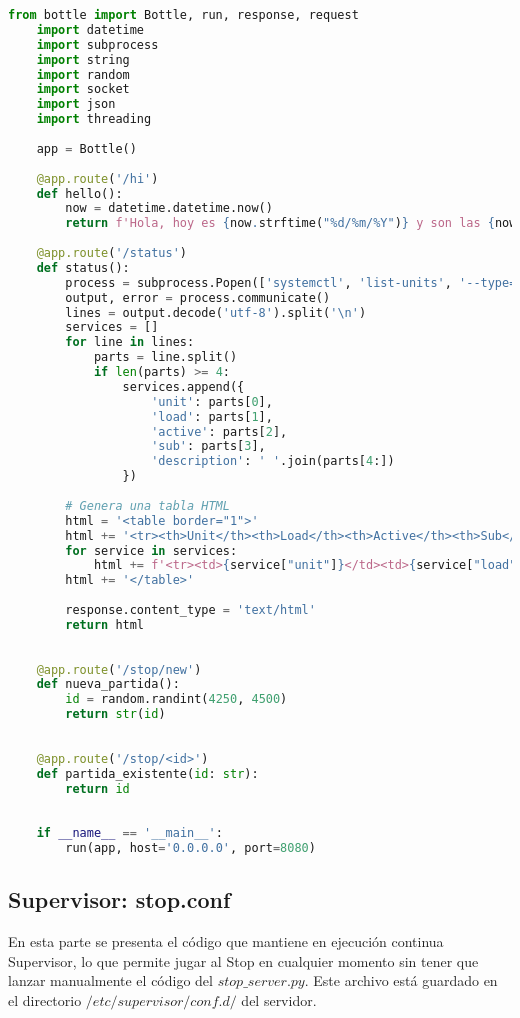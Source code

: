\documentclass{article}
\begin{document}
\begin{lstlisting}[language=Python, caption={Código Python}, label={lst:python_code}]
    from bottle import Bottle, run, response, request
    import datetime
    import subprocess
    import string
    import random
    import socket
    import json
    import threading
    
    app = Bottle()
    
    @app.route('/hi')
    def hello():
        now = datetime.datetime.now()
        return f'Hola, hoy es {now.strftime("%d/%m/%Y")} y son las {now.strftime("%H:%M:%S")}'
    
    @app.route('/status')
    def status():
        process = subprocess.Popen(['systemctl', 'list-units', '--type=service', '--state=running'], stdout=subprocess.PIPE)
        output, error = process.communicate()
        lines = output.decode('utf-8').split('\n')
        services = []
        for line in lines:
            parts = line.split()
            if len(parts) >= 4:
                services.append({
                    'unit': parts[0],
                    'load': parts[1],
                    'active': parts[2],
                    'sub': parts[3],
                    'description': ' '.join(parts[4:])
                })
    
        # Genera una tabla HTML
        html = '<table border="1">'
        html += '<tr><th>Unit</th><th>Load</th><th>Active</th><th>Sub</th><th>Description</th></tr>'
        for service in services:
            html += f'<tr><td>{service["unit"]}</td><td>{service["load"]}</td><td>{service["active"]}</td><td>{service["sub"]}</td><td>{service["description"]}</td></tr>'
        html += '</table>'
    
        response.content_type = 'text/html'
        return html
    
    
    @app.route('/stop/new')
    def nueva_partida():
        id = random.randint(4250, 4500)
        return str(id)
    
    
    @app.route('/stop/<id>')
    def partida_existente(id: str):
        return id
    
    
    if __name__ == '__main__':
        run(app, host='0.0.0.0', port=8080)
\end{lstlisting}

\subsection{Supervisor: stop.conf}
En esta parte se presenta el código que mantiene en ejecución continua Supervisor, lo que permite jugar al Stop en cualquier momento sin tener que lanzar manualmente 
el código del $stop\_server.py$. Este archivo está guardado en el directorio $/etc/supervisor/conf.d/$ del servidor.
\end{document}
